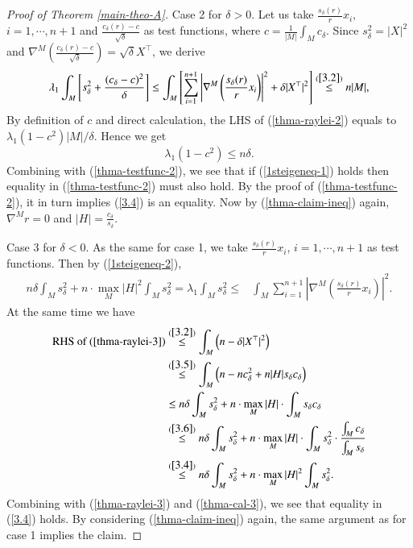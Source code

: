 \documentclass{amsart}
\numberwithin{equation}{section}
\theoremstyle{remark}
\renewcommand{\(}{\left(}
\renewcommand{\)}{\right)}
\renewcommand{\~}{\tilde}
\renewcommand{\-}{\overline}
\renewcommand{\d}{\delta}
\renewcommand{\l}{\lambda}
\begin{document}
\begin{proof}[Proof of Theorem \ref{main-theo-A}]
	Case 2 for $\d>0$. Let us take $\frac{s_\d(r)}{r} x_i$, $i=1,\cdots,n+1$ and $\frac{c_\d(r)-c}{\sqrt{\d}}$ as test functions, where $c=\frac{1}{|M|}\int_M c_\d$.
	Since $s_\d^2=|X|^2$ and $\nabla^M \(\frac{c_\d(r)-c}{\sqrt{\d}}\)=\sqrt{\d}X^\top$, we derive
	\begin{align}\label{thma-raylei-2}
	\l_1 \int_M \left[ s_\d^2+\frac{(c_\d-c)^2}{\d} \right] \leq \int_M \left[ \sum_{i=1}^{n+1}\left|\nabla^M \(\frac{s_\d(r)}{r}x_i\)\right|^2+ \d |X^\top|^2\right] \overset{(\ref{3.2})}\leq n|M|,
	\end{align}
	By definition of $c$ and direct calculation, the LHS of (\ref{thma-raylei-2}) equals to $\lambda_1(1-c^2)|M|/\d$.
	Hence we get $$\l_1(1-c^2)\leq n\d.$$
	Combining with (\ref{thma-testfunc-2}), we see that if (\ref{1steigeneq-1}) holds then equality in (\ref{thma-testfunc-2}) must also hold. By the proof of (\ref{thma-testfunc-2}), it in turn implies (\ref{3.4}) is an equality. Now by (\ref{thma-claim-ineq}) again, $\nabla^M r=0$ and $|H|=\frac{c_\d}{s_\d}$.
	
	Case 3 for $\d<0$. As the same for case 1, we take $\frac{s_\d(r)}{r} x_i$, $i=1,\cdots,n+1$ as test functions. Then by (\ref{1steigeneq-2}),
	\begin{align}\label{thma-raylei-3}
	n\d\int_M s_\d^2+n \cdot \max_M |H|^2  \int_M s_\d^2=\l_1 \int_M s_\d^2\leq &\int_M \sum_{i=1}^{n+1}\left|\nabla^M \(\frac{s_\d(r)}{r}x_i\)\right|^2.
	\end{align}
	At the same time we have
	\begin{align}\label{thma-cal-3}
	\text{RHS of (\ref{thma-raylei-3})}  &\overset{(\ref{3.2})}{\leq} \int_M \(n-\d|X^\top|^2\) \nonumber \\
	&\overset{(\ref{3.5})}{\leq} \int_M \(n-nc_\d^2+n |H|s_\d c_\d\)\nonumber \\
	& \leq n\d\int_M s_\d^2+n \cdot \max_M |H| \cdot \int_M s_\d c_\d \nonumber  \\
	& \overset{(\ref{3.6})}{\leq} n\d\int_M s_\d^2+n \cdot \max_M |H| \cdot \int_M s_\d^2 \cdot \frac{\int_M c_\d}{\int_M s_\d} \nonumber \\
	& \overset{(\ref{3.4})}{\leq} n\d\int_M s_\d^2+n \cdot \max_M |H|^2  \int_M s_\d^2.
	\end{align}
	Combining with (\ref{thma-raylei-3}) and (\ref{thma-cal-3}), we see that equality in (\ref{3.4}) holds. By considering (\ref{thma-claim-ineq}) again, the same argument as for case 1 implies the claim.
	
\end{proof}
\end{document}
